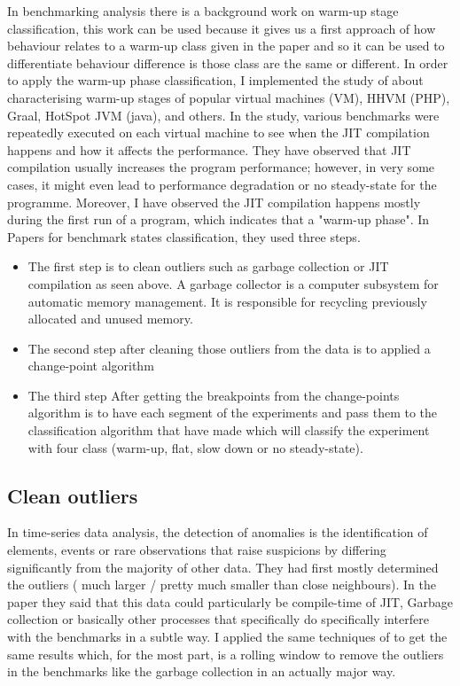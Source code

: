 \documentclass{article}
\begin{document}
In benchmarking analysis there is a background work on warm-up stage classification, this work can be used because it gives us a first approach of how behaviour relates to a warm-up class given in the paper and so it can be used to differentiate behaviour difference is those class are the same or different. In order to apply the warm-up phase classification, I implemented the study of \citep{barrett2017virtual} about characterising warm-up stages of popular virtual machines (VM), HHVM (PHP), Graal, HotSpot JVM (java), and others. 
In the study, various benchmarks were repeatedly executed on each virtual machine to see when the JIT compilation happens and how it affects the performance.
They have observed that JIT compilation usually increases the program performance; however, in very some cases, it might even lead to performance degradation or no steady-state for the programme. Moreover, I have observed the JIT compilation happens mostly during the first run of a program, which indicates that a "warm-up phase".
In \citep{barrett2017virtual} Papers for benchmark states classification, they used three steps.

\begin{itemize}
    \item The first step is to clean outliers such as garbage collection or JIT compilation as seen above. A garbage collector is a computer subsystem for automatic memory management.  It is responsible for recycling previously allocated and unused memory.  
    \item The second step after cleaning those outliers from the data is to applied a change-point algorithm \citep{killick2014changepoint}
    \item The third step After getting the breakpoints from the change-points algorithm is to have each segment of the experiments and pass them to the classification algorithm that \citep{barrett2017virtual} have made which will classify the experiment with four class (warm-up, flat, slow down or no steady-state).
\end{itemize}




\subsection{Clean outliers}

In time-series data analysis, the detection of anomalies is the identification of elements, events or rare observations that raise suspicions by differing significantly from the majority of other data. They had first mostly determined the outliers ( much larger / pretty much smaller than close neighbours). In the paper \citep{barrett2017virtual} they said that this data could particularly be compile-time of JIT, Garbage collection or basically other processes that specifically do specifically interfere with the benchmarks in a subtle way. I applied the same techniques of \citep{barrett2017virtual} to get the same results which, for the most part, is a rolling window to remove the outliers in the benchmarks like the garbage collection in an actually major way.
\end{document}
